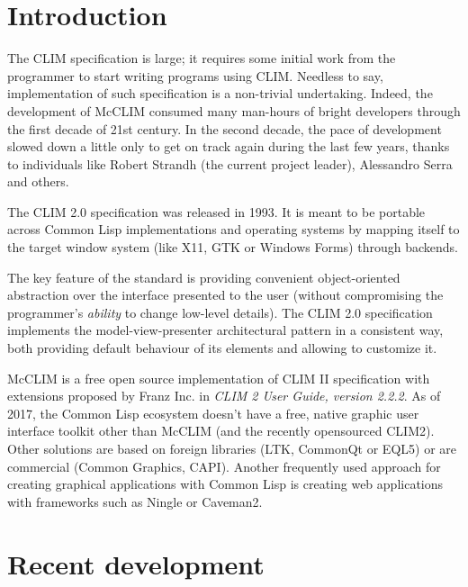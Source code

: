 \documentclass{sig-alternate-05-2015}
\begin{document}

\section{Introduction}

The CLIM specification is large; it requires some initial work from the
programmer to start writing programs using CLIM. Needless to say,
implementation of such specification is a non-trivial undertaking.
Indeed, the development of McCLIM consumed many man-hours of bright
developers through the first decade of 21st century. In the second
decade, the pace of development slowed down a little only to get on
track again during the last few years, thanks to individuals like
Robert Strandh (the current project leader), Alessandro Serra and others.

The CLIM 2.0 specification was released in 1993. It is meant to be
portable across Common Lisp\cite{ansi:common:lisp} implementations and
operating systems by mapping itself to the target window system (like
X11\cite{X11}, GTK\cite{GTK} or Windows Forms\cite{WindowsForms})
through backends.

The key feature of the standard is providing convenient
object-oriented abstraction over the interface presented to the user
(without compromising the programmer's \emph{ability} to change low-level
details). The CLIM 2.0 specification implements the model-view-presenter
architectural pattern in a consistent way, both providing default behaviour of its elements and allowing to customize it.

McCLIM is a free open source implementation of CLIM II specification
with extensions proposed by Franz Inc. in \emph{CLIM 2 User Guide,
  version 2.2.2}. As of 2017, the Common Lisp ecosystem doesn't have a
free, native graphic user interface toolkit other than McCLIM (and the
recently opensourced CLIM2\cite{CLIM2}). Other solutions are based
on foreign libraries (LTK\cite{LTK}, CommonQt\cite{CommonQt} or
EQL5\cite{EQL5}) or are commercial (Common Graphics\cite{CG},
CAPI\cite{CAPI}). Another frequently used approach for creating
graphical applications with Common Lisp is creating web applications
with frameworks such as Ningle\cite{Ningle} or Caveman2\cite{Caveman2}.

\section{Recent development}
\end{document}
